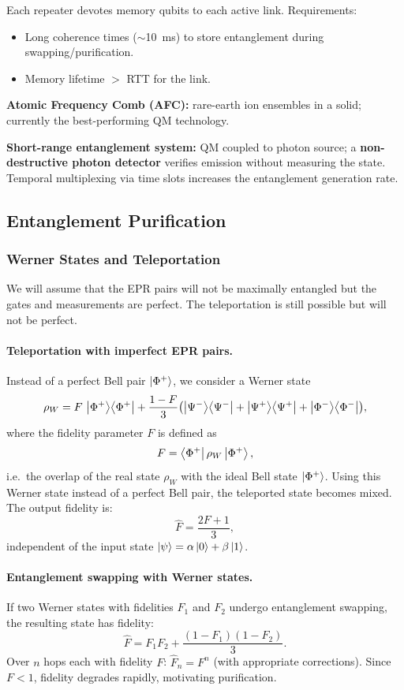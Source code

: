 \documentclass[10pt,a4paper]{article}
\begin{document}
\begin{tcolorbox}[defstyle, title={Definition}]
Each repeater devotes memory qubits to each active link. Requirements:
\begin{itemize}[nosep]
\item Long coherence times ($\sim$10~ms) to store entanglement during swapping/purification.
\item Memory lifetime $>$ RTT for the link.
\end{itemize}
\textbf{Atomic Frequency Comb (AFC):} rare-earth ion ensembles in a solid; currently the best-performing QM technology.

\textbf{Short-range entanglement system:} QM coupled to photon source; a \textbf{non-destructive photon detector} verifies emission without measuring the state. Temporal multiplexing via time slots increases the entanglement generation rate.
\end{tcolorbox}

\subsection{Entanglement Purification}

\subsubsection*{Werner States and Teleportation}

We will assume that the EPR pairs will not be maximally entangled but the gates and measurements are perfect. The teleportation is still possible but will not be perfect.

\paragraph{Teleportation with imperfect EPR pairs.}
Instead of a perfect Bell pair $\ket{\Phi^+}$, we consider a Werner state
\[
\rho_W = F\,\ket{\Phi^+}\!\bra{\Phi^+}
+ \frac{1-F}{3}\bigl(\ket{\Psi^-}\!\bra{\Psi^-}
+ \ket{\Psi^+}\!\bra{\Psi^+}
+ \ket{\Phi^-}\!\bra{\Phi^-}\bigr),
\]
where the fidelity parameter $F$ is defined as
\[
F = \bra{\Phi^+}\rho_W\ket{\Phi^+},
\]
i.e.\ the overlap of the real state $\rho_W$ with the ideal Bell state $\ket{\Phi^+}$.
Using this Werner state instead of a perfect Bell pair, the teleported state becomes mixed. The output fidelity is:
\[
\hat{F}=\frac{2F+1}{3},
\]
independent of the input state $\ket{\psi}=\alpha\ket{0}+\beta\ket{1}$.

\paragraph{Entanglement swapping with Werner states.} If two Werner states with fidelities $F_1$ and $F_2$ undergo entanglement swapping, the resulting state has fidelity:
\[
\hat{F}=F_1F_2+\frac{(1-F_1)(1-F_2)}{3}.
\]
Over $n$ hops each with fidelity $F$: $\hat{F}_n=F^n$ (with appropriate corrections). Since $F<1$, fidelity degrades rapidly, motivating purification.
\end{document}
